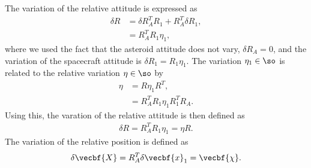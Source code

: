 \documentclass[11pt, reqno]{article}    %
\begin{document}
The variation of the relative attitude is expressed as
\begin{align*}
    \delta R &= \delta R_A^T R_1 + R_A^T \delta R_1 , \\
    &= R_A^T R_1 \eta_1,
\end{align*}
where we used the fact that the asteroid attitude does not vary, \( \delta R_A = 0\), and the variation of the spacecraft attitude is \( \delta R_1 = R_1 \eta_1\).
The variation \( \eta_1 \in \so \) is related to the relative variation \( \eta \in \so \) by
\begin{align*}
    \eta &= R \eta_1 R^T ,\\
    &= R_A^T R_1 \eta_1 R_1^T R_A .
\end{align*}
Using this, the varation of the relative attitude is then defined as
\begin{align}\label{eq:relative_attitude_variation}
    \delta R = R_A^T R_1 \eta_1 = \eta R.
\end{align}
The variation of the relative position is defined as
\begin{align}\label{eq:relative_position_variation}
    \delta \vecbf{X} = R_A^T \delta \vecbf{x}_1 = \vecbf{\chi} .
\end{align}
\end{document}
